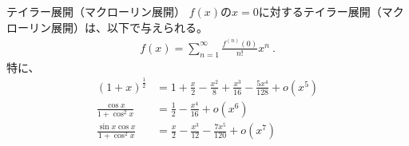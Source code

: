 




\begin{Formula}[label=formula:taylorexpansion]{テイラー展開（マクローリン展開）}
$f(x)$の$x = 0$に対するテイラー展開（マクローリン展開）は、以下で与えられる。
\begin{align*}
  f(x) = \sum_{n=1}^{\infty}\frac{f^{(n)}(0)}{n!}x^n\ .
\end{align*}
特に、
\begin{align*}
  (1+x)^\frac12 &= 1+\frac x2-\frac{x^2}8+\frac{x^3}{16}-\frac{5x^4}{128}+o\!\left(x^5\right)\\
  \frac{\cos x}{1+\cos^2x} &= \frac12-\frac{x^4}{16}+o\left(x^6\right)\\
  \frac{\sin x\cos x}{1+\cos^2x} &= \frac x2-\frac{x^3}{12}-\frac{7x^5}{120}+o\left(x^7\right)
\end{align*}
\end{Formula}



